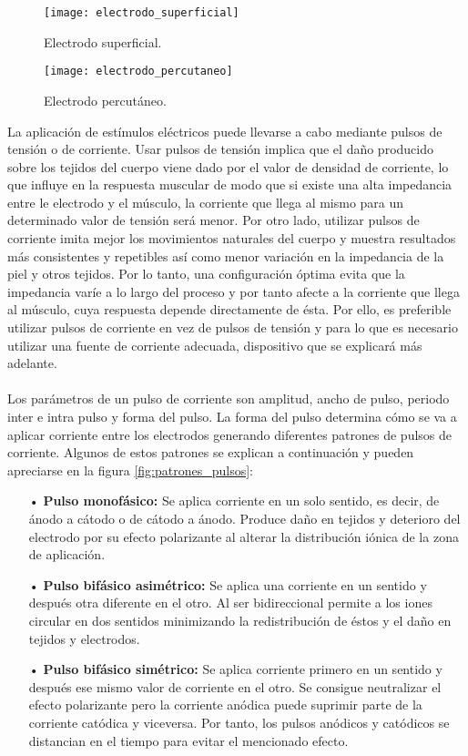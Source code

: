 \begin{figure}[!htb]
  \texttt{[image: electrodo\_superficial]}
  \caption{Electrodo superficial\cite{electrodo_superficial}.}\label{fig:electrodo_superficial}
\endminipage\hfill
{}
  \texttt{[image: electrodo\_percutaneo]}
  \caption{Electrodo percutáneo\cite{electrodo_percutaneo}.}\label{fig:electrodo_percutaneo}
\endminipage\hfill
\end{figure}

La aplicación de estímulos eléctricos puede llevarse a cabo mediante pulsos de tensión o de corriente. Usar pulsos de tensión implica que el daño producido sobre los tejidos del cuerpo viene dado por el valor de densidad de corriente, lo que influye en la respuesta muscular de modo que si existe una alta impedancia entre le electrodo y el músculo, la corriente que llega al mismo para un determinado valor de tensión será menor. Por otro lado, utilizar pulsos de corriente imita mejor los movimientos naturales del cuerpo y muestra resultados más consistentes y repetibles así como menor variación en la impedancia de la piel y otros tejidos. Por lo tanto, una configuración óptima evita que la impedancia varíe a lo largo del proceso y por tanto afecte a la corriente que llega al músculo, cuya respuesta depende directamente de ésta\cite{FES}. Por ello, es preferible utilizar pulsos de corriente en vez de pulsos de tensión y para lo que es necesario utilizar una fuente de corriente adecuada, dispositivo que se explicará más adelante.
\\
\\
Los parámetros de un pulso de corriente son amplitud, ancho de pulso, periodo inter e intra pulso y forma del pulso\cite{parametros_FES}. La forma del pulso determina cómo se va a aplicar corriente entre los electrodos generando diferentes patrones de pulsos de corriente. Algunos de estos patrones se explican a continuación\cite{FES} y pueden apreciarse en la figura \ref{fig:patrones_pulsos}:

\begin{itemize}
\item[•] \textbf{Pulso monofásico:} Se aplica corriente en un solo sentido, es decir, de ánodo a cátodo o de cátodo a ánodo. Produce daño en tejidos y deterioro del electrodo por su efecto polarizante al alterar la distribución iónica de la zona de aplicación.
\item[•] \textbf{Pulso bifásico asimétrico:} Se aplica una corriente en un sentido y después otra diferente en el otro. Al ser bidireccional permite a los iones circular en dos sentidos minimizando la redistribución de éstos y el daño en tejidos y electrodos.
\item[•] \textbf{Pulso bifásico simétrico:} Se aplica corriente primero en un sentido y después ese mismo valor de corriente en el otro. Se consigue neutralizar el efecto polarizante pero la corriente anódica puede suprimir parte de la corriente catódica y viceversa. Por tanto, los pulsos anódicos y catódicos se distancian en el tiempo para evitar el mencionado efecto.
\end{itemize}

